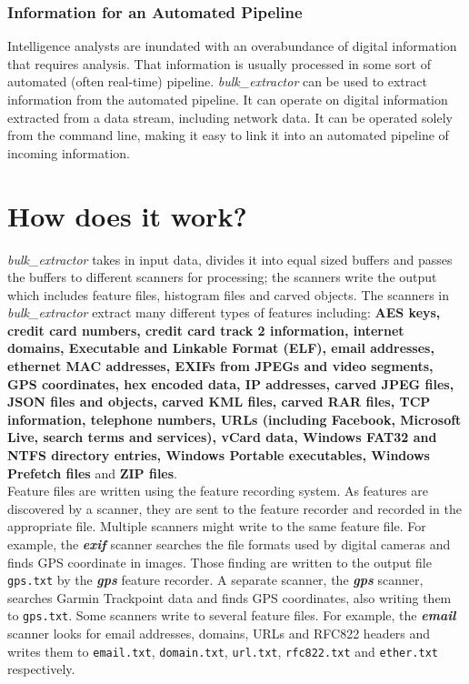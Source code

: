 \documentclass[DIV=calc, paper=a4, fontsize=11pt]{article}	 %
\newcommand \bulk {\textit{bulk\_extractor}\xspace}
\begin{document}
\subsubsection*{Information for an Automated Pipeline}
Intelligence analysts are inundated with an overabundance of digital information that requires analysis. That information is usually processed in some sort of automated (often real-time) pipeline. \bulk can be used to extract information from the automated pipeline. It can operate on digital information extracted from a data stream, including network data. It can be operated solely from the command line, making it easy to link it into an automated pipeline of incoming information. 

\section*{How does it work?}
\bulk takes in input data, divides it into equal sized buffers and passes the buffers to different scanners for processing; the scanners write the output which includes feature files, histogram files and carved objects. The scanners in \bulk extract many different types of features including: \textbf{AES keys, credit card numbers, credit card track 2 information, internet domains, Executable and Linkable Format (ELF), email addresses, ethernet MAC addresses, EXIFs from JPEGs and video segments, GPS coordinates, hex encoded data, IP addresses, carved JPEG files, JSON files and objects, carved KML files, carved RAR files, TCP information, telephone numbers, URLs (including Facebook, Microsoft Live, search terms and services), vCard data, Windows FAT32 and NTFS directory entries, Windows Portable executables, Windows Prefetch files} and \textbf{ZIP files}. \\

\noindent
Feature files are written using the feature recording system. As features are discovered by a scanner, they are sent to the feature recorder and recorded in the appropriate file. Multiple scanners might write to the same feature file. For example, the \textbf{\textit{exif}} scanner searches the file formats used by digital cameras and finds GPS coordinate in images. Those finding are written to the output file \texttt{gps.txt} by the \textit{\textbf{gps}} feature recorder. A separate scanner, the \textbf{\textit{gps}} scanner, searches Garmin Trackpoint data and finds GPS coordinates, also writing them to \texttt{gps.txt}. Some scanners write to several feature files. For example, the \textbf{\textit{email}} scanner looks for email addresses, domains, URLs and RFC822 headers and writes them to \texttt{email.txt}, \texttt{domain.txt}, \texttt{url.txt}, \texttt{rfc822.txt} and \texttt{ether.txt} respectively. \\
\end{document}
